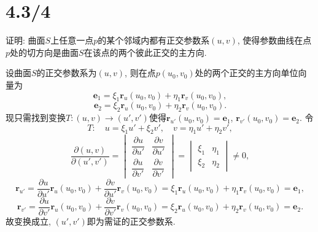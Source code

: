 \documentclass[11pt,a4paper]{article}
\begin{document}
\section{4.3/4}
\begin{problem}
证明: 曲面$S$上任意一点$p$的某个邻域内都有正交参数系$(u,v)$, 使得参数曲线在点$p$处的切方向是曲面$S$在该点的两个彼此正交的主方向.
\end{problem}
设曲面$S$的正交参数系为$(u,v)$, 则在点$p(u_0,v_0)$处的两个正交的主方向单位向量为
$$\mathbf{e}_1=\xi_1\mathbf{r}_u(u_0,v_0)+\eta_1\mathbf{r}_v(u_0,v_0),$$
$$\mathbf{e}_2=\xi_2\mathbf{r}_u(u_0,v_0)+\eta_2\mathbf{r}_v(u_0,v_0).$$
现只需找到变换$T:(u,v)\longrightarrow(u',v')$使得$\mathbf{r}_{u'}(u_0,v_0)=\mathbf{e}_1$, $\mathbf{r}_{v'}(u_0,v_0)=\mathbf{e}_2$. 令
$$T:\quad u=\xi_1u'+\xi_2v',\quad v=\eta_1u'+\eta_2v',$$
$$\frac{\partial(u,v)}{\partial(u',v')}=
  \begin{vmatrix}
    \dfrac{\partial u}{\partial u'} & \dfrac{\partial v}{\partial u'} \\
    \dfrac{\partial u}{\partial v'} & \dfrac{\partial v}{\partial v'}
  \end{vmatrix}=\begin{vmatrix}
    \xi_1 & \eta_1 \\ \xi_2 & \eta_2
  \end{vmatrix}\neq0,$$
$$\mathbf{r}_{u'}=\frac{\partial u}{\partial u'}\mathbf{r}_u(u_0,v_0)+\frac{\partial v}{\partial u'}\mathbf{r}_v(u_0,v_0)=\xi_1\mathbf{r}_u(u_0,v_0)+\eta_1\mathbf{r}_v(u_0,v_0)=\mathbf{e}_1,$$
$$\mathbf{r}_{v'}=\frac{\partial u}{\partial v'}\mathbf{r}_u(u_0,v_0)+\frac{\partial v}{\partial v'}\mathbf{r}_v(u_0,v_0)=\xi_2\mathbf{r}_u(u_0,v_0)+\eta_2\mathbf{r}_v(u_0,v_0)=\mathbf{e}_2.$$
故变换成立, $(u',v')$即为需证的正交参数系.
\end{document}
